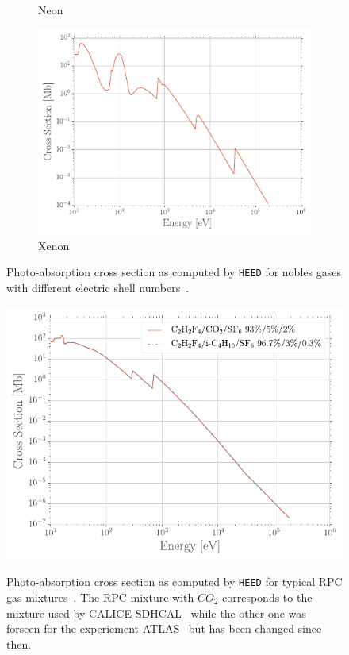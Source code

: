 \begin{figure}[H]
\begin{subfigure}{0.5\linewidth}
			\caption{\label{fig:PAIR:C} Neon}
		\end{subfigure}
		\begin{subfigure}{0.5\linewidth}
			\centering
			\includegraphics[width = 0.5\plotwidth]{fig/chapt4/HEED-Xenon.pdf}
			\caption{\label{fig:PAIR:D} Xenon}
		\end{subfigure}
		\caption{\label{fig:PAIR} Photo-absorption cross section as computed by \texttt{HEED} for nobles gases with different electric shell numbers~\cite{VINCENT2017}.}
	\end{figure}
	
	\begin{figure}[H]
		\centering
		\includegraphics[width = 0.7\plotwidth]{fig/chapt4/HEED-RPC.pdf}\\
		\caption{\label{fig:PAIR-RPC} Photo-absorption cross section as computed by \texttt{HEED} for typical RPC gas mixtures~\cite{VINCENT2017}. The RPC mixture with $CO_2$ corresponds to the mixture used by CALICE SDHCAL~\cite{ARNAUD2015} while the other one was forseen for the experiement ATLAS~\cite{RIEGLER2003} but has been changed since then.}
	\end{figure}
	
